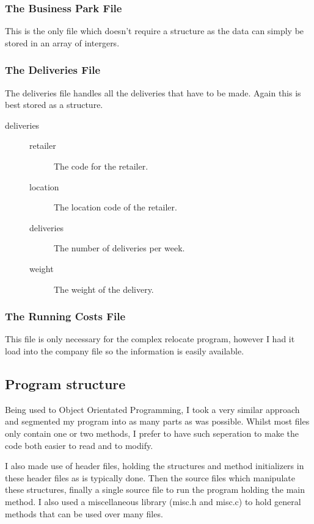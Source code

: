 \documentclass[10pt,letterpaper]{article}
\begin{document}
      \subsubsection{The Business Park File}
	This is the only file which doesn't require a structure as the data can simply be stored in an array of intergers.
	
      \subsubsection{The Deliveries File}
	The deliveries file handles all the deliveries that have to be made. Again this is best stored as a structure.
	
	\begin{description}
	  \item[deliveries]\hfill
	    \begin{description}
	      \item[retailer] The code for the retailer.
	      \item[location] The location code of the retailer.
	      \item[deliveries] The number of deliveries per week.
	      \item[weight] The weight of the delivery.
	    \end{description}
	\end{description}
      
      \subsubsection{The Running Costs File}
	This file is only necessary for the complex relocate program, however I had it load into the company file so the information is easily available.
    
    \subsection{Program structure}
      Being used to Object Orientated Programming, I took a very similar approach and segmented my program into as many parts as was possible. Whilst most files only contain one or two methods, I prefer to have such seperation to make the code both easier to read and to modify.
      
      I also made use of header files, holding the structures and method initializers in these header files as is typically done. Then the source files which manipulate these structures, finally a single source file to run the program holding the main method. I also used a miscellaneous library (misc.h and misc.c) to hold general methods that can be used over many files.
  
\end{document}
